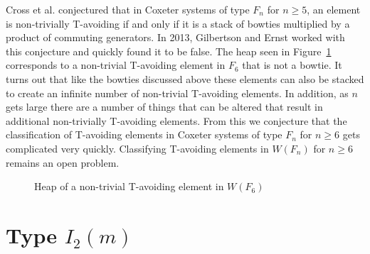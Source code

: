 Cross et al. conjectured that in Coxeter systems of type $F_n$ for $n \geq 5$, an element is non-trivially T-avoiding if and only if it is a stack of bowties multiplied by a product of commuting generators. In 2013, Gilbertson and Ernst worked with this conjecture and quickly found it to be false. The heap seen in Figure~\ref{fig:f6bat} corresponds to a non-trivial T-avoiding element in $F_6$ that is not a bowtie. It turns out that like the bowties discussed above these elements can also be stacked to create an infinite number of non-trivial T-avoiding elements. In addition, as $n$ gets large there are a number of things that can be altered that result in additional non-trivially T-avoiding elements. From this we conjecture that the classification of T-avoiding elements in Coxeter systems of type $F_n$ for $n \geq 6$ gets complicated very quickly. Classifying T-avoiding elements in $W(F_n)$ for $n \geq 6$ remains an open problem. 

\begin{figure}[h!]\centering
{}
\caption{Heap of a non-trivial T-avoiding element in $W(F_6)$}\label{fig:f6bat}
\end{figure}


\section{Type $I_2(m)$}


